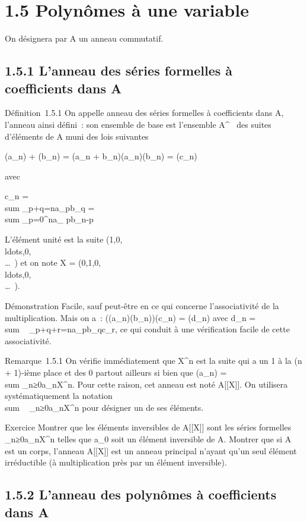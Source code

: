 
\section{1.5 Polynômes à une variable}

On désignera par A un anneau commutatif.

\subsection{1.5.1 L'anneau des séries formelles à coefficients dans A}

Définition~1.5.1 On appelle anneau des séries formelles à coefficients
dans A, l'anneau ainsi défini~: son ensemble de base est l'ensemble
A^~ des suites d'éléments de A muni des lois suivantes

(a_n) + (b_n) = (a_n +
b_n)\quad (a_n)(b_n) =
(c_n)

avec

c_n = \\sum
_p+q=na_pb_q = \\sum
_p=0^na_ pb_n-p

L'élément unité est la suite
(1,0,\\ldots,0,\\\ldots~)
et on note X =
(0,1,0,\\ldots,0,\\\ldots~).

Démonstration Facile, sauf peut-être en ce qui concerne l'associativité
de la multiplication. Mais on a~:
((a_n)(b_n))(c_n) = (d_n) avec
d_n = \\sum ~
_p+q+r=na_pb_qc_r, ce qui conduit à
une vérification facile de cette associativité.

Remarque~1.5.1 On vérifie immédiatement que X^n est la suite
qui a un 1 à la (n + 1)-ième place et des 0 partout ailleurs si bien que
(a_n) =\ \\sum
 _n≥0a_nX^n. Pour cette raison, cet
anneau est noté A[[X]]. On utilisera systématiquement la
notation \\sum ~
_n≥0a_nX^n pour désigner un de ses éléments.

Exercice Montrer que les éléments inversibles de A[[X]] sont les
séries formelles \\\sum
 _n≥0a_nX^n telles que a_0 soit
un élément inversible de A. Montrer que si A est un corps, l'anneau
A[[X]] est un anneau principal n'ayant qu'un seul élément
irréductible (à multiplication près par un élément inversible).

\subsection{1.5.2 L'anneau des polynômes à coefficients dans A}

